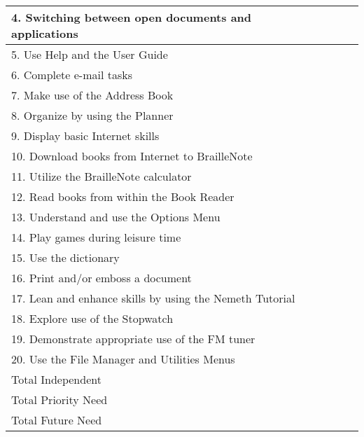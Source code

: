 \documentclass[10pt,letterpaper,twoside]{report}
\begin{document}
{{{{\begin{longtable}[!htbp]{|m{10.0cm}||m{1.5cm}|m{1.5cm}||m{2.0cm}|}
		4. Switching between open documents and applications     &         &      &   \\ \hline
		5. Use Help and the User Guide                           &         &      &   \\ \hline
		6. Complete e-mail tasks                                 &         &      &   \\ \hline
		7. Make use of the Address Book                          &         &      &   \\ \hline
		8. Organize by using the Planner                         &         &      &   \\ \hline
		9. Display basic Internet skills                         &         &      &   \\ \hline
		10. Download books from Internet to BrailleNote          &         &      &   \\ \hline
		11. Utilize the BrailleNote calculator                   &         &      &   \\ \hline
		12. Read books from within the Book Reader               &         &      &   \\ \hline
		13. Understand and use the Options Menu                  &         &      &   \\ \hline
		14. Play games during leisure time                       &         &      &   \\ \hline
		15. Use the dictionary                                   &         &      &   \\ \hline
		16. Print and/or emboss a document                       &         &      &   \\ \hline
		17. Lean and enhance skills by using the Nemeth Tutorial &         &      &   \\ \hline
		18. Explore use of the Stopwatch                         &         &      &   \\ \hline
		19. Demonstrate appropriate use of the FM tuner          &         &      &   \\ \hline
		20. Use the File Manager and Utilities Menus             &         &      &   \\ \hline
		\hfill Total Independent                                 &         &      &   \\ \hline
		\hfill Total Priority Need                               &         &      &   \\\hline
		\hfill Total Future Need                                 &         &      &   \\\hline
	\end{longtable}
}
}}}
\end{document}
